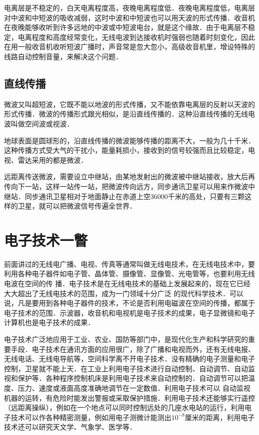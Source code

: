 电离层是不稳定的，白天电离程度高，夜晚电离程度低．夜晚电离程度低，电离层对中波和中短波的吸收减弱，这时中波和中短波也可以用天波的形式传播．收音机在夜晚能够收听到许多远地的中波或中短波电台，就是这个缘故．由于电离层不稳定，电离程度和高度经常变化，无线电波到达接收机时强弱也随着时刻变化，因此在用一般收音机收听短波广播时，声音常是忽大忽小，高级收音机里，增设特殊的线路自动控制音量，来解决这个问题．

\subsection{直线传播}

微波又叫超短波，它既不能以地波的形式传播，又不能依靠电离层的反射以天波的形式传播．微波的传播形式跟光相似，是沿直线传播的．这种沿直线传播的无线电波叫做空间波或视波．

地球表面是圆球形的，沿直线传播的微波能够传播的距离不大，一般为几十千米．这种传播方式受大气的干扰小，能量耗损小，接收到的信号较强而且比较稳定，电视、雷达采用的都是微波．

远距离传送微波，需要设立中继站，由某地发射出的微波被中继站接收，放大后再传向下一站，这样一站传一站，把微波传向远方，同步通讯卫星可以用来作微波中继站．同步通讯卫星相对于地面静止在赤道上空36000千米的高处，只要有三颗这样的卫星，就可以把微波信号传遍全世界．

\section{电子技术一瞥}
前面讲过的无线电广播、电视、传真等通常叫做无线电技术，在无线电技术中，要利用各种电子器件如电子管、晶体管、摄像管、显像管、光电管等，也要利用无线电波在空间的传
播．电子技术是在无线电技术的基础上发展起来的，现在它已经大大超出了无线电技术的范围，成为一门领域十分广泛
的现代科学技术．可以说，凡是要用到各种电子器件的技术，不论是否利用电磁波在空间的传播，都属于电子技术的范围．示波器，收音机和电视机是电子技术的成果，电子显微镜和电子计算机也是电子技术的成果．

电子技术广泛地应用于工业、农业、国防等部门中，是现代化生产和科学研究的重要手段．电子技术在通讯方面的应用很广，除了广播和电视而外，还有无线电报、无线电话、无线电导航等，空间科学离不开电子技术．没有精确的电子测量和电子控制，卫星就不能上天．在工业上利用电子技术进行自动控制、自动调节、自动监视和保护等．各种程序控制机床是利用电子技术来自动控制的．自动调节可以把温度、压力、速度或液面高度准确地调节在一定数值．利用电子技术可以
自动监视机器的运转，有危险时能发出警报或采取保护措施．利用电子技术还能够实行遥控（远距离操纵），例如在一个地点可以同时控制远处的几座水电站的运行，利用电子技术可以作各种精密测量，例如用电子测微计能测出$10^{-8}$厘米的距离，利用电子技术还可以研究天文学、气象学、医学等．

